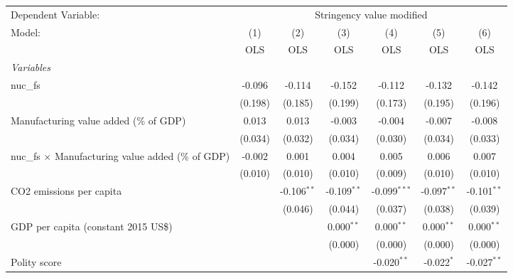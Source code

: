 
\begingroup
\centering
\begin{tabular}{lcccccc}
   \toprule
   Dependent Variable: & \multicolumn{6}{c}{Stringency value modified}\\
   Model:                                                    & (1)     & (2)           & (3)           & (4)            & (5)           & (6)\\  
                                                             &  OLS    & OLS           & OLS           & OLS            & OLS           & OLS\\  
   \midrule
   \emph{Variables}\\
   nuc\_fs                                                   & -0.096  & -0.114        & -0.152        & -0.112         & -0.132        & -0.142\\   
                                                             & (0.198) & (0.185)       & (0.199)       & (0.173)        & (0.195)       & (0.196)\\   
   Manufacturing value added (\% of GDP)                     & 0.013   & 0.013         & -0.003        & -0.004         & -0.007        & -0.008\\   
                                                             & (0.034) & (0.032)       & (0.034)       & (0.030)        & (0.034)       & (0.033)\\   
   nuc\_fs $\times$ Manufacturing value added (\% of GDP)    & -0.002  & 0.001         & 0.004         & 0.005          & 0.006         & 0.007\\   
                                                             & (0.010) & (0.010)       & (0.010)       & (0.009)        & (0.010)       & (0.010)\\   
   CO2 emissions per capita                                  &         & -0.106$^{**}$ & -0.109$^{**}$ & -0.099$^{***}$ & -0.097$^{**}$ & -0.101$^{**}$\\   
                                                             &         & (0.046)       & (0.044)       & (0.037)        & (0.038)       & (0.039)\\   
   GDP per capita (constant 2015 US\$)                       &         &               & 0.000$^{**}$  & 0.000$^{**}$   & 0.000$^{**}$  & 0.000$^{**}$\\   
                                                             &         &               & (0.000)       & (0.000)        & (0.000)       & (0.000)\\   
   Polity score                                              &         &               &               & -0.020$^{**}$  & -0.022$^{*}$  & -0.027$^{**}$\\   

\end{tabular}
